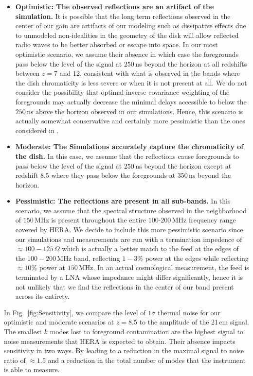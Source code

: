 \documentclass[twocolumn]{emulateapj}
\begin{document}
\begin{itemize}
\item {\bf Optimistic: The observed reflections are an artifact of the simulation.} It is possible that the long term reflections observed in the center of our gain are artifacts of our modeling such as dissipative effects due to unmodeled non-idealities in the geometry of the disk will allow reflected radio waves to be better absorbed or escape into space. In our most optimistic scenario, we assume their absence in which case the foregrounds pass below the level of the signal at $250$\,ns beyond the horizon at all redshifts between $z=7$ and $12$, consistent with what is observed in the bands where the dish chromaticity is less severe or when it is not present at all. We do not consider the possibility that optimal inverse covariance weighting of the foregrounds  may actually decrease the minimal delays accessible to below the $250$\,ns above the horizon observed in our simulations. Hence, this scenario is actually somewhat conservative and certainly more pessimistic than the ones considered in \citet{Pober:2014,Liu:2015a,Liu:2015b,EwallWice:2015b}. 
 
\item {\bf Moderate: The Simulations accurately capture the chromaticity of the dish.} In this case, we assume that the reflections cause foregrounds to pass below the level of the signal at $250$\,ns beyond the horizon except at redshift $8.5$ where they pass below the foregrounds at $350$\,ns beyond the horizon. 


\item {\bf Pessimistic: The reflections are present in all sub-bands.} In this scenario, we assume that the spectral structure observed in the neighborhood of $150$\,MHz is present throughout the entire $100$-$200$\,MHz frequency range covered by HERA. We decide to include this more pessimistic scenario since our simulations and measurements are run with a termination impedence of $\approx 100-125$\,$\Omega$ which is actually a better match to the feed at the edges of the $100-200$\,MHz band, reflecting $1-3$\% power at the edges while reflecting $\approx 10$\% power at $150$\,MHz. In an actual cosmological measurement, the feed is terminated by a LNA whose impedance might differ significantly, hence it is not unlikely that we find the reflections in the center of our band present across its entirety. 
 
\end{itemize}
In Fig.~\ref{fig:Sensitivity}, we compare the level of $1\sigma$ thermal noise for our optimistic and moderate scenarios at $z=8.5$ to the amplitude of the 21\,cm signal. The smallest $k$ modes lost to foreground contamination are the highest signal to noise measurements that HERA is expected to obtain. Their absence impacts sensitivity in two ways. By leading to a reduction in the maximal signal to noise ratio of $\approx 1.5$ and a reduction in the total number of modes that the instrument is able to measure. 
\end{document}

